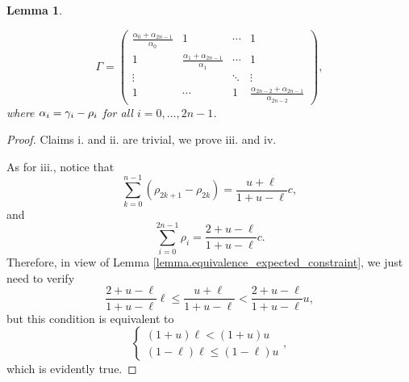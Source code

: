 \documentclass[10pt]{article}
\newtheorem{lemma}[thm]{Lemma}
\begin{document}
\begin{lemma}
\begin{enumerate}[label={\roman{*}.}, ref={\ref{lemma.proposal_dirparam}.\roman{*}}]
 \begin{equation*}
  \Gamma = 
  \begin{pmatrix}
   \frac{\alpha_{0} + \alpha_{2n-1}}{\alpha_0}
   &   1   &   \cdots   &   1
   \\
   1 &
   \frac{\alpha_{1} + \alpha_{2n-1}}{\alpha_1}
   & \cdots & 1 
   \\
   \vdots & & \ddots & \vdots\\
   1 &\cdots & 1 &
   \frac{\alpha_{2n-2} + \alpha_{2n-1}}{\alpha_{2n-2}}
  \end{pmatrix},
 \end{equation*}
 where $\alpha_i = \gamma_i  - \rho_i$ for all $i=0,\dots,2n-1$. 
\end{enumerate}
\end{lemma}
\begin{proof}
Claims i. and ii. are trivial, we prove iii. and iv. 
 
As for iii., notice that 
\begin{equation*}
 \sum_{k=0}^{n-1} (\rho_{2k+1} - \rho_{2k}) = \frac{u+\ell}{1+u-\ell}c,
\end{equation*}
and 
\begin{equation*}
 \sum_{i=0}^{2n-1} \rho_{i}  = \frac{2+u-\ell}{1+u-\ell}c.
\end{equation*}
Therefore, in view of Lemma \ref{lemma.equivalence_expected_constraint}, we just need to verify
\begin{equation*}
 \frac{2+u-\ell}{1+u-\ell}\ell
 \leq 
 \frac{u+\ell}{1+u-\ell}
 <
 \frac{2+u-\ell}{1+u-\ell} u ,
\end{equation*}
but this condition is equivalent to 
\begin{equation*}
 \begin{cases}
  (1+u)\ell < (1+u)u \\
  (1-\ell)\ell \leq (1-\ell) u
 \end{cases},
\end{equation*}
which is evidently true.


\end{proof}
\end{document}
